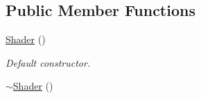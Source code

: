 \subsection*{Public Member Functions}
\begin{DoxyCompactItemize}
\item 
\hyperlink{classsf_1_1_shader_a1d7f28f26b4122959fcafec871c2c3c5}{Shader} ()
\begin{DoxyCompactList}\small\item\em Default constructor. \end{DoxyCompactList}\item 
\hypertarget{classsf_1_1_shader_a4bac6cc8b046ecd8fb967c145a2380e6}{\hyperlink{classsf_1_1_shader_a4bac6cc8b046ecd8fb967c145a2380e6}{$\sim$\+Shader} ()}\label{classsf_1_1_shader_a4bac6cc8b046ecd8fb967c145a2380e6}


\end{DoxyCompactItemize}
